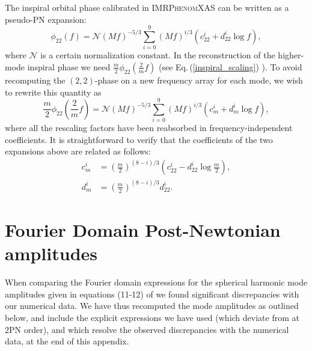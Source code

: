 \documentclass[twocolumn,prd,aps,superscriptaddress,preprintnumbers,tightenlines,showpacs,nofootinbib,eqsecnum,amsfonts,amsmath]{revtex4}
\newcommand{\phX}{\textsc{IMRPhenomXAS}\xspace}
\begin{document}
The inspiral orbital phase calibrated in \phX can be written as a pseudo-PN expansion:
\begin{equation}
\phi_{22}(f)=\mathcal{N} (Mf)^{-5/3}\sum_{i=0}^{9}(Mf)^{i/3}\left(c^{i}_{22}+d_{22}^{i}\log{f}\right),
\end{equation}
where $\mathcal{N}$ is a certain normalization constant. In the reconstruction of the higher-mode inspiral phase we need $\frac{m}{2} \phi_{22}(\frac{2}{m} f)$ (see Eq.\,(\ref{inspiral_scaling}) ). To avoid recomputing the $(2,2)$-phase on a new frequency array for each mode, we wish to rewrite this quantity as
\begin{equation}
\frac{m}{2} \phi_{22}\left( \frac{2}{m} f \right)=\mathcal{N} (Mf)^{-5/3}\sum_{i=0}^{9}(Mf)^{i/3}\left(c^{i}_{m}+d_{m}^{i}\log{f}\right),
\end{equation}
where all the rescaling factors have been reabsorbed in frequency-independent coefficients. It is straightforward to verify that the coefficients of the two expansions above are related as follows:
\begin{align}
c_{m}^{i}&=\left(\frac{m}{2}\right)^{(8-i)/3}\left(c_{22}^{i}-d_{22}^{i}\log{\frac{m}{2}}\right),\nonumber\\
d_{m}^{i}&=\left(\frac{m}{2}\right)^{(8-i)/3}d_{22}^{i}.
\end{align} 



\section{Fourier Domain Post-Newtonian amplitudes}\label{appendix:FPN}

When comparing the Fourier domain  expressions for the 
spherical harmonic mode amplitudes given in 
equations (11-12) of \cite{PNamps} we found significant discrepancies with our numerical data. We have thus recomputed the mode amplitudes as outlined below, and include the explicit expressions we have used (which deviate from \cite{PNamps} at 2PN order), and which resolve the observed discrepancies with the numerical data, at the end of this appendix.

\end{document}
